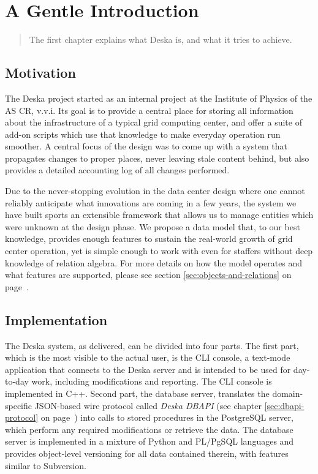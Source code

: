 \documentclass[deska]{subfiles}
\begin{document}
\chapter{A Gentle Introduction}

\begin{abstract}
The first chapter explains what Deska is, and what it tries to achieve.
\end{abstract}

\section{Motivation}

The Deska project started as an internal project at the Institute of Physics of the AS CR, v.v.i.  Its goal is to
provide a central place for storing all information about the infrastructure of a typical grid computing center, and
offer a suite of add-on scripts which use that knowledge to make everyday operation run smoother.  A central focus of
the design was to come up with a system that propagates changes to proper places, never leaving stale content behind,
but also provides a detailed accounting log of all changes performed.

Due to the never-stopping evolution in the data center design where one cannot reliably anticipate what innovations are
coming in a few years, the system we have built sports an extensible framework that allows us to manage entities which
were unknown at the design phase.  We propose a data model that, to our best knowledge, provides enough features to
sustain the real-world growth of grid center operation, yet is simple enough to work with even for staffers without deep
knowledge of relation algebra.  For more details on how the model operates and what features are supported, please see
section \ref{sec:objects-and-relations} on page~\pageref{sec:objects-and-relations}.

\section{Implementation}

The Deska system, as delivered, can be divided into four parts.  The first part, which is the most visible to the actual
user, is the CLI console, a text-mode application that connects to the Deska server and is intended to be used for
day-to-day work, including modifications and reporting.  The CLI console is implemented in C++.  Second part, the
database server, translates the domain-specific JSON-based wire protocol called {\em Deska DBAPI} (see chapter
\ref{sec:dbapi-protocol} on page~\pageref{sec:dbapi-protocol}) into calls to stored procedures in the PostgreSQL server,
which perform any required modifications or retrieve the data.  The database server is implemented in a mixture of
Python and PL/PgSQL languages and provides object-level versioning for all data contained therein, with features similar
to Subversion.
\end{document}
